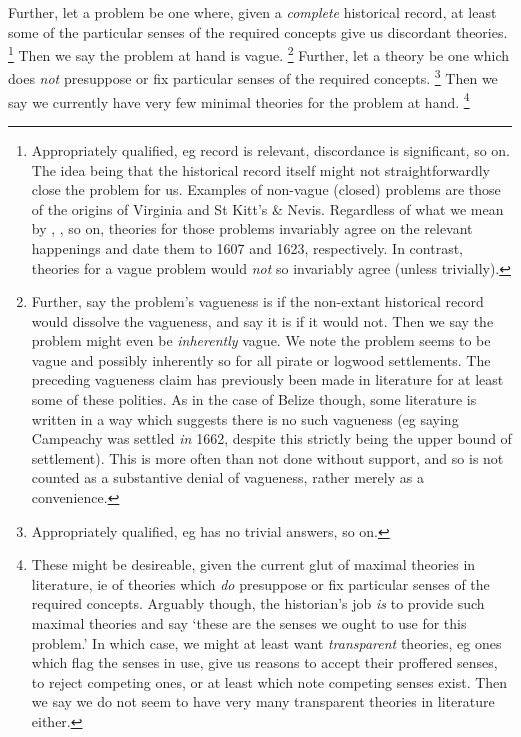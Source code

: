		Further, let a  problem be one where, given a \emph{complete} historical record, at least some of the particular senses of the required concepts give us discordant theories.%
		\footnote{Appropriately qualified, eg record is relevant, discordance is significant, so on. The idea being that the historical record itself might not straightforwardly close the problem for us. Examples of non-vague (closed) problems are those of the origins of Virginia and St Kitt's \& Nevis. Regardless of what we mean by , , so on, theories for those problems invariably agree on the relevant happenings and date them to 1607 and 1623, respectively. In contrast, theories for a vague problem would \emph{not} so invariably agree (unless trivially).}
		Then we say the problem at hand is vague.%
		\footnote{Further, say the problem's vagueness is  if the non-extant historical record would dissolve the vagueness, and say it is  if it would not. Then we say the problem might even be \emph{inherently} vague. We note the problem seems to be vague and possibly inherently so for all pirate or logwood settlements. The preceding vagueness claim has previously been made in literature for at least some of these polities. As in the case of Belize though, some literature is written in a way which suggests there is no such vagueness (eg saying Campeachy was settled \emph{in} 1662, despite this strictly being the upper bound of settlement). This is more often than not done without support, and so is not counted as a substantive denial of vagueness, rather merely as a convenience.}
		Further, let a  theory be one which does \emph{not} presuppose or fix particular senses of the required concepts.%
		\footnote{Appropriately qualified, eg has no trivial answers, so on.} %
		Then we say we currently have very few minimal theories for the problem at hand.%
		\footnote{These might be desireable, given the current glut of maximal theories in literature, ie of theories which \emph{do} presuppose or fix particular senses of the required concepts. Arguably though, the historian's job \emph{is} to provide such maximal theories and say `these are the senses we ought to use for this problem.' In which case, we might at least want \emph{transparent} theories, eg ones which flag the senses in use, give us reasons to accept their proffered senses, to reject competing ones, or at least which note competing senses exist. Then we say we do not seem to have very many transparent theories in literature either.} %
%
%
%
%
